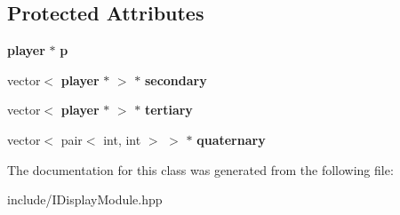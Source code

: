 \subsection*{Protected Attributes}
\begin{DoxyCompactItemize}
\item 
\mbox{\label{class_i_display_module_a61ab3e9d06d2f2ea4165e66cab65acd8}} 
\textbf{ player} $\ast$ {\bfseries p}
\item 
\mbox{\label{class_i_display_module_a87602603ec66bb5e11bfded7d66f8189}} 
vector$<$ \textbf{ player} $\ast$ $>$ $\ast$ {\bfseries secondary}
\item 
\mbox{\label{class_i_display_module_a45dc09e165d015ef164ba1a71823b4f1}} 
vector$<$ \textbf{ player} $\ast$ $>$ $\ast$ {\bfseries tertiary}
\item 
\mbox{\label{class_i_display_module_acbb3def987e9bcb4a1db2c0830bae976}} 
vector$<$ pair$<$ int, int $>$ $>$ $\ast$ {\bfseries quaternary}
\end{DoxyCompactItemize}


The documentation for this class was generated from the following file\+:\begin{DoxyCompactItemize}
\item 
include/I\+Display\+Module.\+hpp\end{DoxyCompactItemize}
